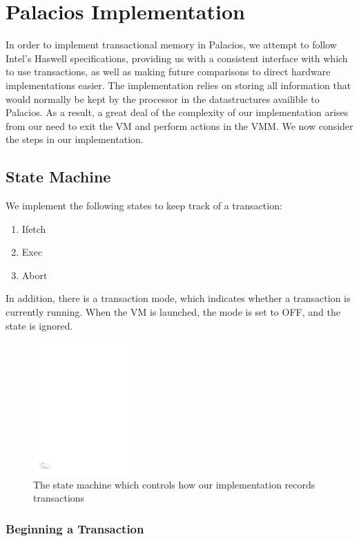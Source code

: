 \documentclass{acm_proc_article-sp}
\begin{document}
\section{Palacios Implementation}
In order to implement transactional memory in Palacios, we attempt to follow 
Intel's Haswell specifications, providing us with a consistent interface with which
to use transactions, as well as making future comparisons to direct hardware
implementations easier. The implementation relies on storing all information
that would normally be kept by the processor in the datastructures availible
to Palacios. As a result, a great deal of the complexity of our implementation
arises from our need to exit the VM and perform actions in the VMM. We now
consider the steps in our implementation.

\subsection{State Machine}

We implement the following states to keep track of a transaction: 
\begin{enumerate}
\item Ifetch
\item Exec
\item Abort 
\end{enumerate}

In addition, there is a transaction mode, which indicates whether a transaction
is currently running. When the VM is launched, the mode is set to OFF, and the
state is ignored.

\begin{figure}[t]
\centering
\includegraphics[height=2.0in]{figs/fsm.pdf}
\caption{The state machine which controls how our implementation records 
transactions}
\label{flowchart}
\end{figure}
\subsubsection{Beginning a Transaction}
\end{document}
